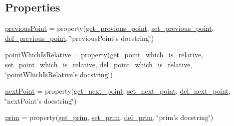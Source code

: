 \subsection*{Properties}
\begin{DoxyCompactItemize}
\item 
\hyperlink{classdestruction_1_1_create_t_b_n_1_1_create_t_b_n_a93f27496286b397430688526b3bd38f8}{previous\-Point} = property(\hyperlink{classdestruction_1_1_create_t_b_n_1_1_create_t_b_n_aa39802c3b8f2d96ed95b656c18dae325}{get\-\_\-previous\-\_\-point}, \hyperlink{classdestruction_1_1_create_t_b_n_1_1_create_t_b_n_a0ea69b97f8317b3c2810ffe5c39f5d43}{set\-\_\-previous\-\_\-point}, \hyperlink{classdestruction_1_1_create_t_b_n_1_1_create_t_b_n_a7362464ecfe42265ce053d56259c431a}{del\-\_\-previous\-\_\-point}, \char`\"{}previous\-Point's docstring\char`\"{})
\item 
\hyperlink{classdestruction_1_1_create_t_b_n_1_1_create_t_b_n_a9815988f7a089bd24ab5ef5565b92cd7}{point\-Which\-Is\-Relative} = property(\hyperlink{classdestruction_1_1_create_t_b_n_1_1_create_t_b_n_adbb7093b16d4e258c7aac35018383fe8}{get\-\_\-point\-\_\-which\-\_\-is\-\_\-relative}, \hyperlink{classdestruction_1_1_create_t_b_n_1_1_create_t_b_n_ab6c4e5daa0b7a42354d76cb1c5c3a75a}{set\-\_\-point\-\_\-which\-\_\-is\-\_\-relative}, \hyperlink{classdestruction_1_1_create_t_b_n_1_1_create_t_b_n_a8327869fe9fc5852d0cdfdfc4c152e37}{del\-\_\-point\-\_\-which\-\_\-is\-\_\-relative}, \char`\"{}point\-Which\-Is\-Relative's docstring\char`\"{})
\item 
\hyperlink{classdestruction_1_1_create_t_b_n_1_1_create_t_b_n_adab2d1fa97e15afccd8a0dd0453d0e44}{next\-Point} = property(\hyperlink{classdestruction_1_1_create_t_b_n_1_1_create_t_b_n_a76715d35a97c17a1cd9e3a4f182fde69}{get\-\_\-next\-\_\-point}, \hyperlink{classdestruction_1_1_create_t_b_n_1_1_create_t_b_n_aa2f576aa09d81de8ed5322c1afe6e3c6}{set\-\_\-next\-\_\-point}, \hyperlink{classdestruction_1_1_create_t_b_n_1_1_create_t_b_n_ab8be9ca2c0a7c5431f993e202112f890}{del\-\_\-next\-\_\-point}, \char`\"{}next\-Point's docstring\char`\"{})
\item 
\hyperlink{classdestruction_1_1_create_t_b_n_1_1_create_t_b_n_a8e10ba26232efb708be76c3d6487fd09}{prim} = property(\hyperlink{classdestruction_1_1_create_t_b_n_1_1_create_t_b_n_aeb18165c105b3e8be8315b3af25f5bbe}{get\-\_\-prim}, \hyperlink{classdestruction_1_1_create_t_b_n_1_1_create_t_b_n_ac2ff19000aba2d733c0bdea31bd7ae2b}{set\-\_\-prim}, \hyperlink{classdestruction_1_1_create_t_b_n_1_1_create_t_b_n_adacb5b56206e8270b8eef84ff1fe4959}{del\-\_\-prim}, \char`\"{}prim's docstring\char`\"{})

\end{DoxyCompactItemize}
